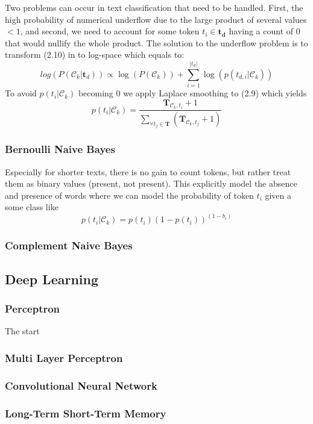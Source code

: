 Two problems can occur in text classification that need to be handled. First, the high probability of numerical underflow due to the large product of several values $<1$, and second, we need to account for some token $t_i \in \boldsymbol{t_d}$ having a count of $0$ that would nullify the whole product. The solution to the underflow problem is to transform (2.10) in to log-space which equals to:
%
\[log(P(\mathcal{C}_k|\boldsymbol{t}_d)) \propto \log(P(\mathcal{C}_k)) + \sum_{i=1}^{|t_{d}|} \log({p(t_{d,i}|\mathcal{C}_k)}) \]
%
To avoid $p({t_{i}}|\mathcal{C}_k)$ becoming $0$ we apply Laplace smoothing to (2.9) which yields
\[p({t_{i}}|\mathcal{C}_k) = \frac{\boldsymbol{T}_{\mathcal{C}_k,t_{i}} + 1}{\sum_{\forall t_j \in \boldsymbol{T}}(\boldsymbol{T}_{\mathcal{C}_k,t_j} + 1)}\]
\subsubsection{Bernoulli Naive Bayes}
Especially for shorter texts, there is no gain to count tokens, but rather treat them as binary values (present, not present). This explicitly model the absence and presence of words where we can model the probability of token $t_i$ given a some class like
\[p(t_{i}|\mathcal{C}_k) = p(t_{i})(1-p(t_{i}))^{(1-b_{i})}\]

\subsubsection{Complement Naive Bayes}


\subsection{Deep Learning}
\subsubsection{Perceptron}
The start
\subsubsection{Multi Layer Perceptron}

\subsubsection{Convolutional Neural Network}
\subsubsection{Long-Term Short-Term Memory}


